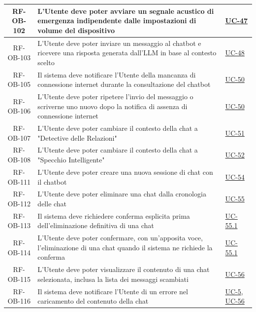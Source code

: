 \documentclass[a4paper,12pt]{article}
\begin{document}
\begin{center}
\begin{longtable}{|c|p{8.5cm}|>{\centering\arraybackslash}p{4cm}|}
RF-OB-102 & L'Utente deve poter avviare un segnale acustico di emergenza indipendente dalle impostazioni di volume del dispositivo & \hyperref[sec:UC-47]{UC-47} \\
\hline

RF-OB-103 & L'Utente deve poter inviare un messaggio al chatbot e ricevere una risposta generata dall'LLM in base al contesto scelto & \hyperref[sec:UC-48]{UC-48} \\
\hline

RF-OB-105 & Il sistema deve notificare l'Utente della mancanza di connessione internet durante la consultazione del chatbot & \hyperref[sec:UC-50]{UC-50} \\
\hline

RF-OB-106 & L'Utente deve poter ripetere l'invio del messaggio o scriverne uno nuovo dopo la notifica di assenza di connessione internet & \hyperref[sec:UC-50]{UC-50} \\
\hline

RF-OB-107 & L'Utente deve poter cambiare il contesto della chat a "Detective delle Relazioni" & \hyperref[sec:UC-51]{UC-51} \\
\hline

RF-OB-108 & L'Utente deve poter cambiare il contesto della chat a "Specchio Intelligente" & \hyperref[sec:UC-52]{UC-52} \\
\hline

RF-OB-111 & L'Utente deve poter creare una nuova sessione di chat con il chatbot & \hyperref[subsec:UC-54]{UC-54} \\
\hline

RF-OB-112 & L'Utente deve poter eliminare una chat dalla cronologia delle chat & \hyperref[subsec:UC-55]{UC-55} \\
\hline

RF-OB-113 & Il sistema deve richiedere conferma esplicita prima dell'eliminazione definitiva di una chat & \hyperref[subsec:UC-55.1]{UC-55.1} \\
\hline

RF-OB-114 & L'Utente deve poter confermare, con un'apposita voce, l'eliminazione di una chat quando il sistema ne richiede la conferma & \hyperref[subsec:UC-55.1]{UC-55.1} \\
\hline

RF-OB-115 & L'Utente deve poter visualizzare il contenuto di una chat selezionata, inclusa la lista dei messaggi scambiati & \hyperref[subsec:UC-56]{UC-56} \\
\hline

RF-OB-116 & Il sistema deve notificare l'Utente di un errore nel caricamento del contenuto della chat & \hyperref[sec:UC-5]{UC-5}, \hyperref[subsec:UC-56]{UC-56} \\
\hline


\end{longtable}
\end{center}
\end{document}
